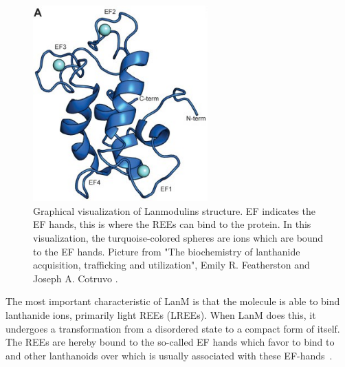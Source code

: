 \begin{figure}[H]
    \centering
    \includegraphics[width=0.6\textwidth]{./media/images/lanm_structure}
    \caption{Graphical visualization of Lanmodulins structure. EF indicates the EF hands, this is where the REEs can bind to the protein. In this visualization, the turquoise-colored spheres are  ions which are bound to the EF hands. Picture from "The biochemistry of lanthanide acquisition, trafficking and utilization", Emily R. Featherston and Joseph A. Cotruvo \cite{lanmroleinbiology}.}
    \label{fig:lanm_structure}
\end{figure}

The most important characteristic of LanM is that the molecule is able to bind lanthanide ions, primarily light REEs (LREEs).
When LanM does this, it undergoes a transformation from a disordered state to a compact form of itself.
The REEs are hereby bound to the so-called EF hands which favor to bind to  and other lanthanoids over  which is usually associated with these EF-hands~\cite{lanmstructure}.





